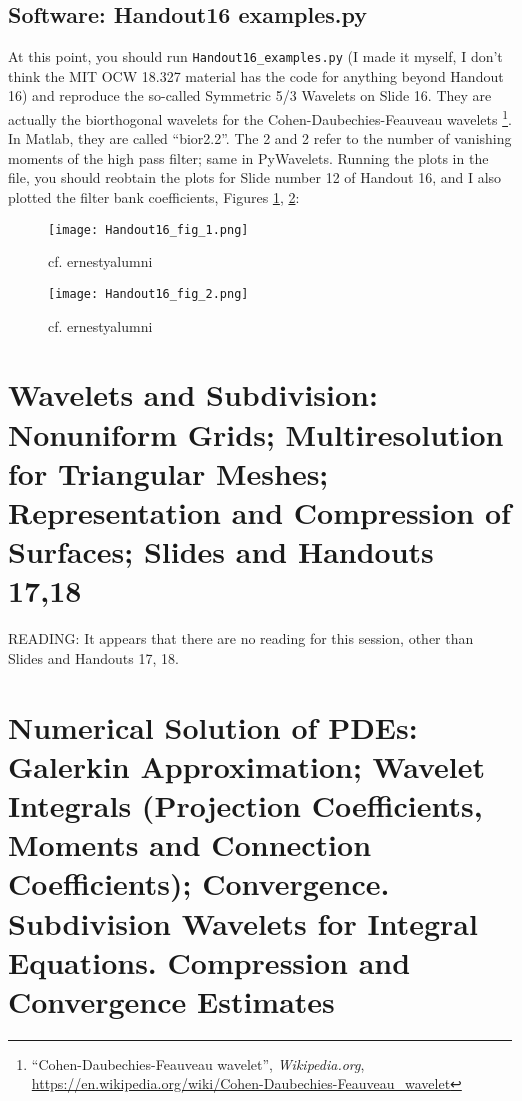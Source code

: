 \documentclass[twoside]{amsart}
\theoremstyle{plain}
\theoremstyle{definition}
\theoremstyle{remark}
\numberwithin{equation}{section}
\begin{document}
\subsection{Software: Handout16 examples.py}

At this point, you should run \verb|Handout16_examples.py| (I made it myself, I don't think the MIT OCW 18.327 material has the code for anything beyond Handout 16) and reproduce the so-called Symmetric 5/3 Wavelets on Slide 16.  They are actually the biorthogonal wavelets for the Cohen-Daubechies-Feauveau wavelets \footnote{``Cohen-Daubechies-Feauveau wavelet'', \emph{Wikipedia.org}, \url{https://en.wikipedia.org/wiki/Cohen-Daubechies-Feauveau_wavelet}}.  In Matlab, they are called ``bior2.2''.  The 2 and 2 refer to the number of vanishing moments of the high pass filter; same in PyWavelets.  
Running the plots in the file, you should reobtain the plots for Slide number 12 of Handout 16, and I also plotted the filter bank coefficients, Figures \ref{Fig:Handout16_fig_1}, \ref{Fig:Handout16_fig_2}:

\begin{figure}[h!]\label{Fig:Handout16_fig_1}
 \caption{cf. ernestyalumni}
 \centering
   \texttt{[image: Handout16\_fig\_1.png]}
\end{figure}

\begin{figure}[h!]\label{Fig:Handout16_fig_2}
 \caption{cf. ernestyalumni}
 \centering
   \texttt{[image: Handout16\_fig\_2.png]}
\end{figure}


\section{Wavelets and Subdivision: Nonuniform Grids; Multiresolution for Triangular Meshes; Representation and Compression of Surfaces; Slides and Handouts 17,18}

READING: It appears that there are no reading for this session, other than Slides and Handouts 17, 18. 

\section{Numerical Solution of PDEs: Galerkin Approximation; Wavelet Integrals (Projection Coefficients, Moments and Connection Coefficients); Convergence. Subdivision Wavelets for Integral Equations. Compression and Convergence Estimates}
\end{document}
